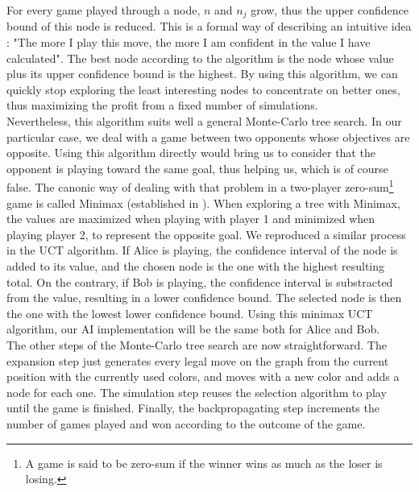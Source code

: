  For every game played through a node, $n$ and $n_j$ grow, thus the upper confidence bound of this node is reduced. This is a formal way of describing an intuitive idea : "The more I play this move, the more I am confident in the value I have calculated". The best node according to the algorithm is the node whose value plus its upper confidence bound is the highest. By using this algorithm, we can quickly stop exploring the least interesting nodes to concentrate on better ones, thus maximizing the profit from a fixed number of simulations.\\

Nevertheless, this algorithm suits well a general Monte-Carlo tree search. In our particular case, we deal with a game between two opponents whose objectives are opposite. Using this algorithm directly would bring us to consider that the opponent is playing toward the same goal, thus helping us, which is of course false. The canonic way of dealing with that problem in a two-player zero-sum\footnote{A game is said to be zero-sum if the winner wins as much as the loser is losing.} game is called Minimax (established in \cite{Minimax}). When exploring a tree with Minimax, the values are maximized when playing with player 1 and minimized when playing player 2, to represent the opposite goal. We reproduced a similar process in the UCT algorithm. If Alice is playing, the confidence interval of the node is added to its value, and the chosen node is the one with the highest resulting total. On the contrary, if Bob is playing, the confidence interval is substracted from the value, resulting in a lower confidence bound. The selected node is then the one with the lowest lower confidence bound.
Using this minimax UCT algorithm, our AI implementation will be the same both for Alice and Bob.\\

The other steps of the Monte-Carlo tree search are now straightforward. The expansion step just generates every legal move on the graph from the current position with the currently used colors, and moves with a new color and adds a node for each one. The simulation step reuses the selection algorithm to play until the game is finished. Finally, the backpropagating step increments the number of games played and won according to the outcome of the game.\\


